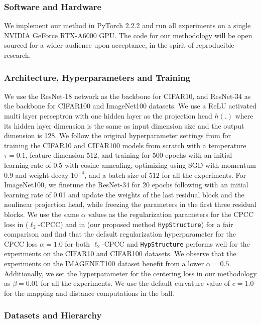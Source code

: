 \subsubsection{Software and Hardware} We implement our method in PyTorch 2.2.2 and run all experiments on a single NVIDIA GeForce RTX-A6000 GPU. The code for our methodology will be open sourced for a wider audience upon acceptance, in the
spirit of reproducible research.

\subsubsection{Architecture, Hyperparameters and Training}
We use the ResNet-18 \citep{he2015deep} network as the backbone for CIFAR10, and ResNet-34 as the backbone for CIFAR100 and ImageNet100 datasets. We use a ReLU activated multi layer perceptron with one hidden layer as the projection head $h(.)$ where its hidden layer dimension is the same as input dimension size and the output dimension is 128. We follow the original hyperparameter settings from \citep{2020supcon} for training the CIFAR10 and CIFAR100 models from scratch with a temperature $\tau=0.1$, feature dimension 512, and training for 500 epochs with an initial learning rate of 0.5 with cosine annealing, optimizing using SGD with momentum 0.9 and weight decay $10^{-4}$, and a batch size of $512$ for all the experiments. For ImageNet100, we finetune the ResNet-34 for 20 epochs following \citep{cider2022ming} with an initial learning rate of 0.01 and update the weights of the last residual block and the nonlinear projection head, while freezing the parameters in the first three residual blocks. We use the same $\alpha$ values as the regularization parameters for the CPCC loss in  ($\ell_2$-CPCC) and in  (our proposed method \texttt{HypStructure}) for a fair comparison and find that the default regularization hyperparameter for the CPCC loss $\alpha=1.0$ for both $\ell_2$-CPCC and \texttt{HypStructure} performs well for the experiments on the CIFAR10 and CIFAR100 datasets. We observe that the experiments on the IMAGENET100 dataset benefit from a lower $\alpha=0.5$. Additionally, we set the hyperparameter for the centering loss 
in our methodology as $\beta=0.01$ for all the experiments. We use the default curvature value of $c=1.0$ for the mapping and distance computations in the \Poincare ball. 

\subsubsection{Datasets and Hierarchy}
\label{app:sec_dataset_hierarchy}

